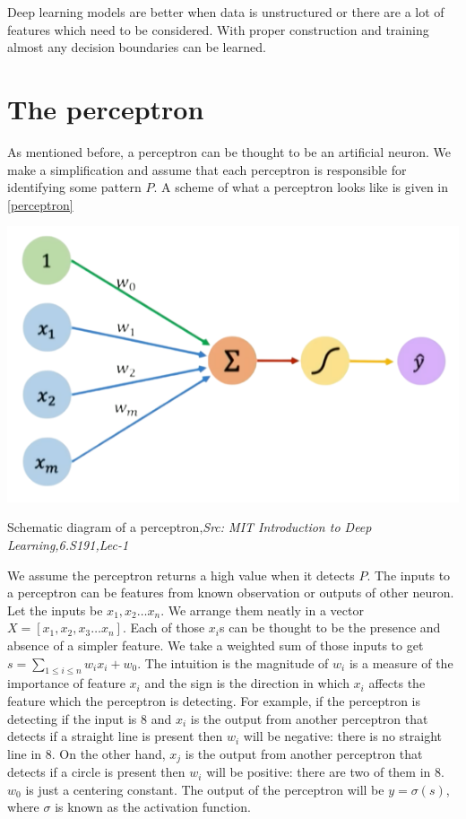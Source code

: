 Deep learning models are better when data is unstructured or there are a lot of features which
need to be considered. With proper construction and training almost any decision boundaries
can be learned.
\section{The perceptron}
As mentioned before, a perceptron can be thought to be an artificial neuron. We make a simplification and assume that each perceptron is responsible for identifying some pattern $P$. A scheme of what a perceptron looks like is given in \ref{perceptron}
\begin{marginfigure}
    \begin{center}
        \includegraphics[width=\textwidth]{graphics/nobg perceptron.png}
    \end{center}
    \caption{Schematic diagram of a perceptron,\textit{Src: MIT Introduction to Deep Learning,6.S191,Lec-1}}\label{perceptron}
\end{marginfigure} 
We assume the perceptron returns a high value when it detects $P$. The inputs to a perceptron can be features from known observation or outputs of other neuron. Let the inputs be $x_1,x_2\hdots x_n$. We arrange them neatly in a vector $X=[x_1,x_2,x_3\hdots x_n]$. Each of those $x_i$s can be thought to be the presence and absence of a simpler feature. We take a weighted sum of those inputs to get $s=\sum_{1\leq i\leq n}w_ix_i+w_0$. The intuition is the magnitude of $w_i$ is a measure of the importance of feature $x_i$ and the sign is the direction in which $x_i$ affects the feature which the perceptron is detecting. For example, if the perceptron is detecting if the input is 8 and $x_i$ is the output from another perceptron that detects if a straight line is present then $w_i$ will be negative: there is no straight line in 8. On the other hand,  $x_j$ is the output from another perceptron that detects if a circle is present then $w_i$ will be positive: there are two of them in 8. $w_0$ is just a centering constant. The output of the perceptron will be $y=\sigma(s)$, where $\sigma$ is known as the activation function. 

